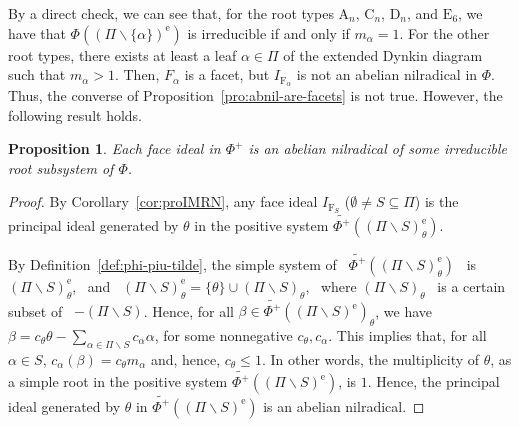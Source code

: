 \documentclass[10pt]{amsart}
\newtheorem{pro}[thm]{Proposition}
\theoremstyle{definition}
\theoremstyle{remark}
\newcommand\wt{\widetilde}
\newcommand\smeno{\smallsetminus}
\newcommand\al{\alpha}
\newcommand\be{\beta}
\newcommand\erm{{\mathrm{e}}}
\renewcommand{\leq}{\leqslant}
\begin{document}


By a direct check, we can see that, for the root types $\mathrm A_n$, $\mathrm C_n$, $\mathrm D_n$, and $\mathrm E_6$, we have that $\Phi((\Pi\smeno \{\al\})^\erm)$ is irreducible if and only if $m_\al=1$. 
For the other root types, there exists at least a leaf $\al\in \Pi$ of the extended Dynkin diagram such that $m_\al>1$. 
Then, $F_\al$ is a facet, but $I_{\mathrm F_\al}$ is not an abelian nilradical in $\Phi$. 
Thus, the converse of Proposition~\ref{pro:abnil-are-facets} is not true. 
However, the following result holds. 

\begin{pro}\label{pro:faces-are-abnil}
Each face ideal in $\Phi^+$ is an abelian nilradical of some irreducible root subsystem of $\Phi$. 
\end{pro}

\begin{proof}
By Corollary~\ref{cor:proIMRN}, any face ideal $I_{\mathrm F_S}$ ($\emptyset\neq S\subseteq \Pi$) is the principal ideal generated by $\theta$ in the positive system $\wt{\Phi^+}((\Pi\smeno S)^\erm_\theta)$. 

\par
By Definition~\ref{def:phi-piu-tilde}, the simple system of \ $\wt{\Phi^+}((\Pi\smeno S)^\erm_\theta)$ \ is \  $(\Pi\smeno S)^\erm_\theta$, \ and \ $(\Pi\smeno S)^\erm_\theta=\{\theta\}\cup(\Pi\smeno S)_\theta$, \  where $(\Pi\smeno S)_\theta$ \ is a certain subset of \ $-(\Pi\smeno S)$.
Hence, for all $\be\in\wt{\Phi^+}((\Pi\smeno S)^\erm)_\theta$, we have  $\be=c_\theta \theta-\sum\limits_{\al\in \Pi\smeno S} c_\al\al$, for some nonnegative $c_\theta, c_\al$. 
This implies that, for all $\al\in S$, $c_\al(\be)= c_\theta m_\al$ and, hence,  $c_\theta\leq 1$.
In other words, the  multiplicity of $\theta$, as a simple root in the positive system $\wt{\Phi^+}((\Pi\smeno S)^\erm)$, is $1$.
Hence, the principal ideal generated by $\theta$ in $\wt{\Phi^+}((\Pi\smeno S)^\erm)$ is an abelian nilradical.
\end{proof}
\end{document}

